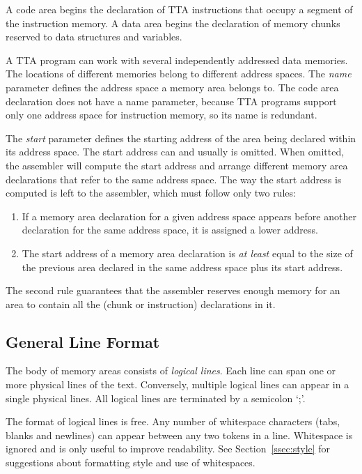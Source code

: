 \documentclass[twoside]{tceusermanual}
\begin{document}
A code area begins the declaration of TTA instructions that occupy a segment
of the instruction memory. A data area begins the declaration of memory
chunks reserved to data structures and variables.

A TTA program can work with several independently addressed data memories.
The locations of different memories belong to different address spaces. The
\emph{name} parameter defines the address space a memory area belongs
to. The code area declaration does not have a name parameter, because TTA
programs support only one address space for instruction memory, so its name
is redundant.

The \emph{start} parameter defines the starting address of the area being
declared within its address space. The start address can and usually is
omitted. When omitted, the assembler will compute the start address and
arrange different memory area declarations that refer to the same address
space. The way the start address is computed is left to the assembler, which
must follow only two rules:

\begin{enumerate}
\item %
  If a memory area declaration for a given address space appears before
  another declaration for the same address space, it is assigned a lower
  address.
\item %
  The start address of a memory area declaration is \emph{at least} equal to
  the size of the previous area declared in the same address space plus its
  start address.
\end{enumerate}

The second rule guarantees that the assembler reserves enough memory for an
area to contain all the (chunk or instruction) declarations in it.

\subsection{General Line Format}
\label{ssec:lines}

The body of memory areas consists of \emph{logical lines}.  Each line can
span one or more physical lines of the text. Conversely, multiple logical
lines can appear in a single physical lines.  All logical lines are
terminated by a semicolon `;'.

The format of logical lines is free. Any number of whitespace characters
(tabs, blanks and newlines) can appear between any two tokens in a line.
Whitespace is ignored and is only useful to improve readability. See
Section~\ref{ssec:style} for suggestions about formatting style and use of
whitespaces.
\end{document}
